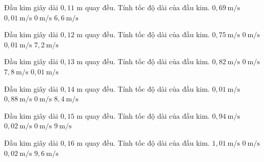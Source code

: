 \begin{ex}
Đầu kim giây dài $0,11$ m quay đều. Tính tốc độ dài của đầu kim.
\choice
{$0,69\ \mathrm{m/s}$}
{\True $0,01\ \mathrm{m/s}$}
{$0\ \mathrm{m/s}$}
{$6,6\ \mathrm{m/s}$}
\end{ex}

\begin{ex}
Đầu kim giây dài $0,12$ m quay đều. Tính tốc độ dài của đầu kim.
\choice
{$0,75\ \mathrm{m/s}$}
{$0\ \mathrm{m/s}$}
{\True $0,01\ \mathrm{m/s}$}
{$7,2\ \mathrm{m/s}$}
\end{ex}

\begin{ex}
Đầu kim giây dài $0,13$ m quay đều. Tính tốc độ dài của đầu kim.
\choice
{$0,82\ \mathrm{m/s}$}
{$0\ \mathrm{m/s}$}
{$7,8\ \mathrm{m/s}$}
{\True $0,01\ \mathrm{m/s}$}
\end{ex}

\begin{ex}
Đầu kim giây dài $0,14$ m quay đều. Tính tốc độ dài của đầu kim.
\choice
{\True $0,01\ \mathrm{m/s}$}
{$0,88\ \mathrm{m/s}$}
{$0\ \mathrm{m/s}$}
{$8,4\ \mathrm{m/s}$}
\end{ex}

\begin{ex}
Đầu kim giây dài $0,15$ m quay đều. Tính tốc độ dài của đầu kim.
\choice
{$0,94\ \mathrm{m/s}$}
{\True $0,02\ \mathrm{m/s}$}
{$0\ \mathrm{m/s}$}
{$9\ \mathrm{m/s}$}
\end{ex}

\begin{ex}
Đầu kim giây dài $0,16$ m quay đều. Tính tốc độ dài của đầu kim.
\choice
{$1,01\ \mathrm{m/s}$}
{$0\ \mathrm{m/s}$}
{\True $0,02\ \mathrm{m/s}$}
{$9,6\ \mathrm{m/s}$}
\end{ex}

